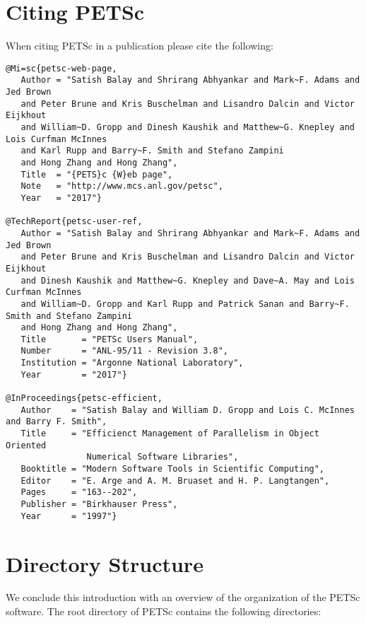 {{%

\section{Citing PETSc}

When citing PETSc in a publication please cite the following:
\begin{verbatim}
@Mi=sc{petsc-web-page,
   Author = "Satish Balay and Shrirang Abhyankar and Mark~F. Adams and Jed Brown
   and Peter Brune and Kris Buschelman and Lisandro Dalcin and Victor Eijkhout
   and William~D. Gropp and Dinesh Kaushik and Matthew~G. Knepley and Lois Curfman McInnes 
   and Karl Rupp and Barry~F. Smith and Stefano Zampini 
   and Hong Zhang and Hong Zhang",
   Title  = "{PETS}c {W}eb page",
   Note   = "http://www.mcs.anl.gov/petsc",
   Year   = "2017"}

@TechReport{petsc-user-ref,
   Author = "Satish Balay and Shrirang Abhyankar and Mark~F. Adams and Jed Brown
   and Peter Brune and Kris Buschelman and Lisandro Dalcin and Victor Eijkhout
   and Dinesh Kaushik and Matthew~G. Knepley and Dave~A. May and Lois Curfman McInnes 
   and William~D. Gropp and Karl Rupp and Patrick Sanan and Barry~F. Smith and Stefano Zampini 
   and Hong Zhang and Hong Zhang",
   Title       = "PETSc Users Manual",
   Number      = "ANL-95/11 - Revision 3.8",
   Institution = "Argonne National Laboratory",
   Year        = "2017"}

@InProceedings{petsc-efficient,
   Author    = "Satish Balay and William D. Gropp and Lois C. McInnes and Barry F. Smith",
   Title     = "Efficienct Management of Parallelism in Object Oriented 
                Numerical Software Libraries",
   Booktitle = "Modern Software Tools in Scientific Computing",
   Editor    = "E. Arge and A. M. Bruaset and H. P. Langtangen",
   Pages     = "163--202",
   Publisher = "Birkhauser Press",
   Year      = "1997"}
\end{verbatim}


\section{Directory Structure}
\label{sec_directory}

We conclude this introduction with an overview of the
organization of the PETSc software.
The root directory of PETSc contains the following directories:

}}

